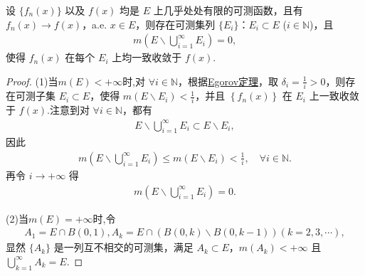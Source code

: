 \documentclass[../../main.tex]{subfiles}
\begin{document}
\begin{corollary}
设 $\{f_n(x)\}$ 以及 $f(x)$ 均是 $E$ 上几乎处处有限的可测函数，且有 $f_n(x)\to f(x)$，a.e. $x\in E$，则存在可测集列 $\{E_i\}$：$E_i\subset E$ ($i\in\mathbb{N}$)，且
\begin{align*}
m\left(E\backslash\bigcup_{i = 1}^{\infty}E_i\right)=0,
\end{align*}
使得 $f_n(x)$ 在每个 $E_i$ 上均一致收敛于 $f(x)$. 
\end{corollary}
\begin{proof}
(1)当$m(E)<+\infty$时,对 $\forall i\in \mathbb{N}$，根据\hyperref[theorem:Egorov定理]{Egorov定理}，取 $\delta _i=\frac{1}{i}>0$，则存在可测子集 $E_i\subset E$，使得 $m\left( E\backslash E_i \right) <\frac{1}{i}$，并且 $\left\{ f_n\left( x \right) \right\}$ 在 $E_i$ 上一致收敛于 $f\left( x \right)$.注意到对 $\forall i\in \mathbb{N}$，都有
\begin{align*}
E\backslash \bigcup_{i=1}^{\infty}{E_i}\subset E\backslash E_i,
\end{align*}
因此
\begin{align*}
m\left( E\backslash \bigcup_{i=1}^{\infty}{E_i} \right) \leqslant m\left( E\backslash E_i \right) <\frac{1}{i},\quad \forall i\in \mathbb{N}.
\end{align*}
再令 $i\rightarrow +\infty$ 得
\begin{align*}
m\left( E\backslash \bigcup_{i=1}^{\infty}{E_i} \right) =0.
\end{align*}

(2)当$m(E)=+\infty$时,令
\begin{align*}
A_1=E\cap B(0,1),
A_k=E\cap (B(0,k)\backslash B(0,k - 1))(k = 2,3,\cdots),
\end{align*}
显然 $\{A_k\}$ 是一列互不相交的可测集，满足 $A_k\subset E$，$m(A_k)<+\infty$ 且 $\bigcup_{k = 1}^{\infty}A_k=E$.


\end{proof}
\end{document}

